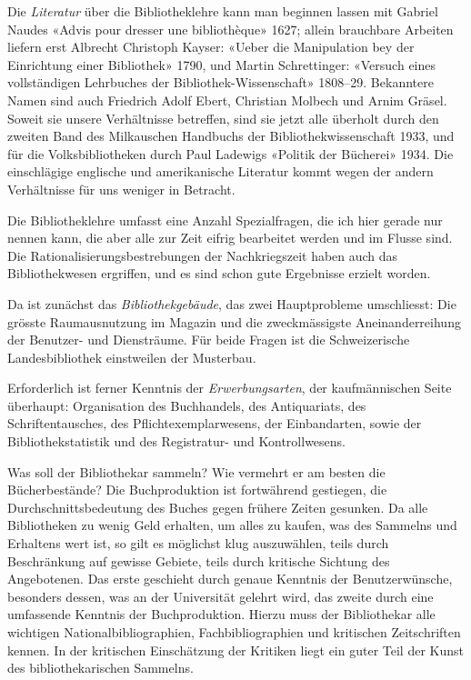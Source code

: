 \documentclass[a4paper,
fontsize=11pt,
oneside,
numbers=noperiodatend,
parskip=half-,
bibliography=totoc,
final
]{scrartcl}
\begin{document}
Die \emph{Literatur} über die Bibliotheklehre kann man beginnen lassen
mit Gabriel Naudes «Advis pour dresser une bibliothèque» 1627; allein
brauchbare Arbeiten liefern erst Albrecht Christoph Kayser: «Ueber die
Manipulation bey der Einrichtung einer Bibliothek» 1790, und Martin
Schrettinger: «Versuch eines vollständigen Lehrbuches der
Bibliothek-Wissenschaft» 1808--29. Bekanntere Namen sind auch Friedrich
Adolf Ebert, Christian Molbech und Arnim Gräsel. Soweit sie unsere
Verhältnisse betreffen, sind sie jetzt alle überholt durch den zweiten
Band des Milkauschen Handbuchs der Bibliothekwissenschaft 1933, und für
die Volksbibliotheken durch Paul Ladewigs «Politik der Bücherei» 1934.
Die einschlägige englische und amerikanische Literatur kommt wegen der
andern Verhältnisse für uns weniger in Betracht.

Die Bibliotheklehre umfasst eine Anzahl Spezialfragen, die ich hier
gerade nur nennen kann, die aber alle zur Zeit eifrig bearbeitet werden
und im Flusse sind. Die Rationalisierungsbestrebungen der Nachkriegszeit
haben auch das Bibliothekwesen ergriffen, und es sind schon gute
Ergebnisse erzielt worden.

Da ist zunächst das \emph{Bibliothekgebäude}, das zwei Hauptprobleme
umschliesst: Die grösste Raumausnutzung im Magazin und die
zweckmässigste Aneinanderreihung der Benutzer- und Dienst\-räume. Für
beide Fragen ist die Schweizerische Landesbibliothek einstweilen der
Musterbau.

Erforderlich ist ferner Kenntnis der \emph{Erwerbungsarten}, der
kaufmännischen Seite überhaupt: Organisation des Buchhandels, des
Antiquariats, des Schriftentausches, des Pflichtexemplarwesens, der
Einbandarten, sowie der Bibliothekstatistik und des Registratur- und
Kontrollwesens.

Was soll der Bibliothekar sammeln? Wie vermehrt er am besten die
Bücherbestände? Die Buchproduktion ist fortwährend gestiegen, die
Durchschnittsbedeutung des Buches gegen frühere Zeiten gesunken. Da alle
Bibliotheken zu wenig Geld erhalten, um alles zu kaufen, was des
Sammelns und Erhaltens wert ist, so gilt es möglichst klug auszuwählen,
teils durch Beschränkung auf gewisse Gebiete, teils durch kritische
Sichtung des Angebotenen. Das erste geschieht durch genaue Kenntnis der
Benutzerwünsche, besonders dessen, was an der Universität gelehrt wird,
das zweite durch eine umfassende Kenntnis der Buchproduktion. Hierzu
muss der Bibliothekar alle wichtigen Nationalbibliographien,
Fachbibliographien und kritischen Zeitschriften kennen. In der
kritischen Einschätzung der Kritiken liegt ein guter Teil der Kunst des
bibliothekarischen Sammelns.
\end{document}
